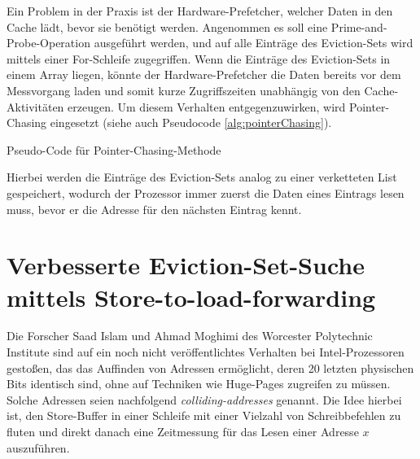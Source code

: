 
Ein Problem in der Praxis ist der Hardware-Prefetcher, welcher Daten in den Cache lädt, bevor sie benötigt werden.
Angenommen es soll eine Prime-and-Probe-Operation ausgeführt werden, und auf alle Einträge des Eviction-Sets wird mittels einer For-Schleife zugegriffen.
Wenn die Einträge des Eviction-Sets in einem Array liegen, könnte der Hardware-Prefetcher die Daten bereits vor dem Messvorgang laden und somit kurze Zugriffszeiten unabhängig von den Cache-Aktivitäten erzeugen.
Um diesem Verhalten entgegenzuwirken, wird Pointer-Chasing eingesetzt (siehe auch Pseudocode \ref{alg:pointerChasing}).

\begin{algorithm}[h]
\DontPrintSemicolon
\caption{Pseudo-Code für Pointer-Chasing-Methode}
\label{alg:pointerChasing}

\end{algorithm}

Hierbei werden die Einträge des Eviction-Sets analog zu einer verketteten List gespeichert, wodurch der Prozessor immer zuerst die Daten eines Eintrags lesen muss, bevor er die Adresse für den nächsten Eintrag kennt.

\section{Verbesserte Eviction-Set-Suche mittels Store-to-load-forwarding}
\label{StoreFor}

Die Forscher Saad Islam und Ahmad Moghimi des Worcester Polytechnic Institute sind auf ein noch nicht veröffentlichtes Verhalten bei Intel-Prozessoren gestoßen, das das Auffinden von Adressen ermöglicht, deren 20 letzten physischen Bits identisch sind, ohne auf Techniken wie Huge-Pages zugreifen zu müssen.
Solche Adressen seien nachfolgend \textit{colliding-addresses} genannt.
Die Idee hierbei ist, den Store-Buffer in einer Schleife mit einer Vielzahl von Schreibbefehlen zu fluten und direkt danach eine Zeitmessung für das Lesen einer Adresse $x$ auszuführen.

